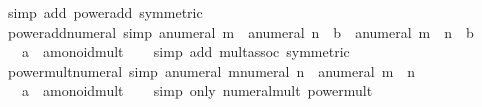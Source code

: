 \begin{isabellebody}
%
\isatagproof
{}\isamarkupfalse%
\ {\isacharparenleft}{\kern0pt}simp\ add{\isacharcolon}{\kern0pt}\ power{\isacharunderscore}{\kern0pt}add\ {\isacharbrackleft}{\kern0pt}symmetric{\isacharbrackright}{\kern0pt}{\isacharparenright}{\kern0pt}%
\endisatagproof
{\isafoldproof}%
%
\isadelimproof
\isanewline
%
\endisadelimproof
\isanewline
{}\isamarkupfalse%
\ power{\isacharunderscore}{\kern0pt}add{\isacharunderscore}{\kern0pt}numeral{}\ {\isacharbrackleft}{\kern0pt}simp{\isacharbrackright}{\kern0pt}{\isacharcolon}{\kern0pt}\ {\isachardoublequoteopen}a{\isacharcircum}{\kern0pt}numeral\ m\ {\isacharasterisk}{\kern0pt}\ {\isacharparenleft}{\kern0pt}a{\isacharcircum}{\kern0pt}numeral\ n\ {\isacharasterisk}{\kern0pt}\ b{\isacharparenright}{\kern0pt}\ {\isacharequal}{\kern0pt}\ a{\isacharcircum}{\kern0pt}numeral\ {\isacharparenleft}{\kern0pt}m\ {\isacharplus}{\kern0pt}\ n{\isacharparenright}{\kern0pt}\ {\isacharasterisk}{\kern0pt}\ b{\isachardoublequoteclose}\isanewline
\ \ \ a\ {\isacharcolon}{\kern0pt}{\isacharcolon}{\kern0pt}\ {\isachardoublequoteopen}{\isacharprime}{\kern0pt}a{\isacharcolon}{\kern0pt}{\isacharcolon}{\kern0pt}monoid{\isacharunderscore}{\kern0pt}mult{\isachardoublequoteclose}\isanewline
%
\isadelimproof
\ \ %
\endisadelimproof
%
\isatagproof
{}\isamarkupfalse%
\ {\isacharparenleft}{\kern0pt}simp\ add{\isacharcolon}{\kern0pt}\ mult{\isachardot}{\kern0pt}assoc\ {\isacharbrackleft}{\kern0pt}symmetric{\isacharbrackright}{\kern0pt}{\isacharparenright}{\kern0pt}%
\endisatagproof
{\isafoldproof}%
%
\isadelimproof
\isanewline
%
\endisadelimproof
\isanewline
{}\isamarkupfalse%
\ power{\isacharunderscore}{\kern0pt}mult{\isacharunderscore}{\kern0pt}numeral\ {\isacharbrackleft}{\kern0pt}simp{\isacharbrackright}{\kern0pt}{\isacharcolon}{\kern0pt}\ {\isachardoublequoteopen}{\isacharparenleft}{\kern0pt}a{\isacharcircum}{\kern0pt}numeral\ m{\isacharparenright}{\kern0pt}{\isacharcircum}{\kern0pt}numeral\ n\ {\isacharequal}{\kern0pt}\ a{\isacharcircum}{\kern0pt}numeral\ {\isacharparenleft}{\kern0pt}m\ {\isacharasterisk}{\kern0pt}\ n{\isacharparenright}{\kern0pt}{\isachardoublequoteclose}\isanewline
\ \ \ a\ {\isacharcolon}{\kern0pt}{\isacharcolon}{\kern0pt}\ {\isachardoublequoteopen}{\isacharprime}{\kern0pt}a{\isacharcolon}{\kern0pt}{\isacharcolon}{\kern0pt}monoid{\isacharunderscore}{\kern0pt}mult{\isachardoublequoteclose}\isanewline
%
\isadelimproof
\ \ %
\endisadelimproof
%
\isatagproof
{}\isamarkupfalse%
\ {\isacharparenleft}{\kern0pt}simp\ only{\isacharcolon}{\kern0pt}\ numeral{\isacharunderscore}{\kern0pt}mult\ power{\isacharunderscore}{\kern0pt}mult{\isacharparenright}{\kern0pt}%

\end{isabellebody}
